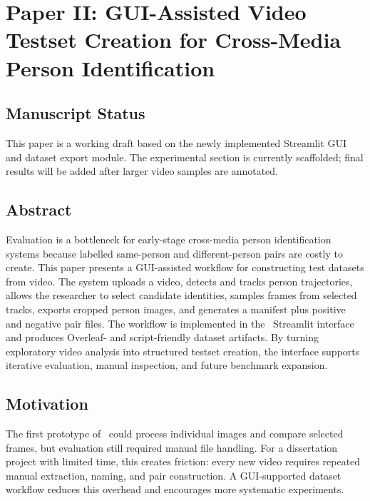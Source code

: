 \chapter[Paper II: GUI-Assisted Video Testset Creation]{Paper II: GUI-Assisted Video Testset Creation for Cross-Media Person Identification}
\label{paper:video-testset-gui}

\section*{Manuscript Status}

This paper is a working draft based on the newly implemented Streamlit GUI and dataset export module. The experimental section is currently scaffolded; final results will be added after larger video samples are annotated.

\section{Abstract}

Evaluation is a bottleneck for early-stage cross-media person identification systems because labelled same-person and different-person pairs are costly to create. This paper presents a GUI-assisted workflow for constructing test datasets from video. The system uploads a video, detects and tracks person trajectories, allows the researcher to select candidate identities, samples frames from selected tracks, exports cropped person images, and generates a manifest plus positive and negative pair files. The workflow is implemented in the \systemname\ Streamlit interface and produces Overleaf- and script-friendly dataset artifacts. By turning exploratory video analysis into structured testset creation, the interface supports iterative evaluation, manual inspection, and future benchmark expansion.

\section{Motivation}

The first prototype of \systemname\ could process individual images and compare selected frames, but evaluation still required manual file handling. For a dissertation project with limited time, this creates friction: every new video requires repeated manual extraction, naming, and pair construction. A GUI-supported dataset workflow reduces this overhead and encourages more systematic experiments.


